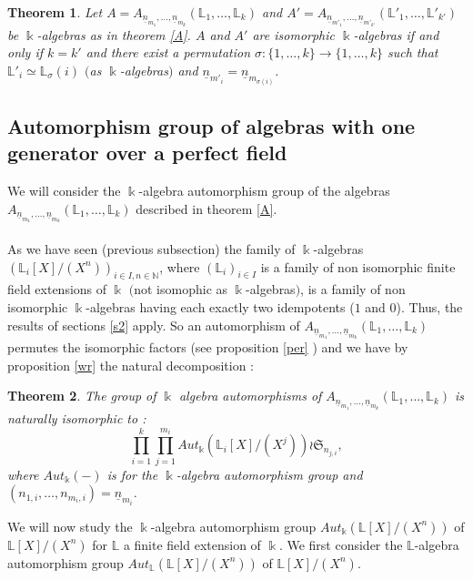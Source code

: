\documentclass[12pt, reqno]{amsart}
\newtheorem{theorem}{Theorem}[section]
\newcommand{\N}{ {\mathbb N} }
\newcommand{\K}{ {\Bbbk} }
\newcommand{\FL}{ {\mathbb L} }
\begin{document}
\begin{theorem}\label{B}
Let $A=A_{\underline{n}_{m_1},\dots, \underline{n}_{m_k}}(\FL_1,\dots ,\FL_k)$ and $A'=A_{\underline{n}_{m'_1},\dots, \underline{n}_{m'_{k'}}}(\FL'_1,\dots ,\FL'_{k'})$ be $\K$-algebras as in theorem \ref{A}. $A$ and $A'$ are isomorphic $\K$-algebras if and only if $k=k'$ and there exist a permutation $\sigma : \{1,\dots ,k \} \to \{1,\dots,k \}$ such that $\FL'_i\simeq \FL_\sigma(i)$ $($as $\K$-algebras$)$ and $\underline{n}_{m'_i}=\underline{n}_{m_{\sigma(i)}}$.
\end{theorem}


\subsection{Automorphism group of algebras with one generator over a perfect field} 
We will consider the $\K$-algebra automorphism group of the algebras $A_{\underline{n}_{m_1},\dots, \underline{n}_{m_k}}(\FL_1,\dots ,\FL_k)$ described in theorem \ref{A}.  \\\\
As we have seen (previous subsection) the family of $\K$-algebras $(\FL_i[X]/(X^n))_{i\in I,n \in \N}$, where $(\FL_i)_{i\in I}$ is a family of non isomorphic finite field extensions of $\K$ $($not isomophic as $\K$-algebras$)$, is a family of non isomorphic $\K$-algebras having each exactly two idempotents ($1$ and $0$). Thus, the results of sections \ref{s2} apply. So an automorphism of $A_{\underline{n}_{m_1},\dots, \underline{n}_{m_k}}(\FL_1,\dots ,\FL_k)$ permutes the isomorphic factors (see proposition \ref{per} ) and we have by proposition \ref{wr} the natural decomposition :

\begin{theorem} 
The group of $\K$ algebra automorphisms of $A_{\underline{n}_{m_1},\dots, \underline{n}_{m_k}}(\FL_1,\dots ,\FL_k)$ is naturally isomorphic to :$$\overset{k}{\underset{i=1}{\prod}} \overset{m_i}{\underset{j=1}{\prod}}Aut_\K(\FL_i[X]/(X^j))\wr \mathfrak{S}_{n_{j,i}},$$
where $Aut_\K(-)$ is for the $\K$-algebra automorphism group and $(n_{1,i},\dots,n_{m_i,i})=\underline{n}_{m_i}$.
\end{theorem}
We will now study the $\K$-algebra automorphism group $Aut_\K(\FL[X]/(X^n))$ of $\FL[X]/(X^n)$ for $\FL$ a finite field extension of $\K$. We first consider the $\FL$-algebra automorphism group $Aut_\FL(\FL[X]/(X^n))$ of $\FL[X]/(X^n)$.
\end{document}
